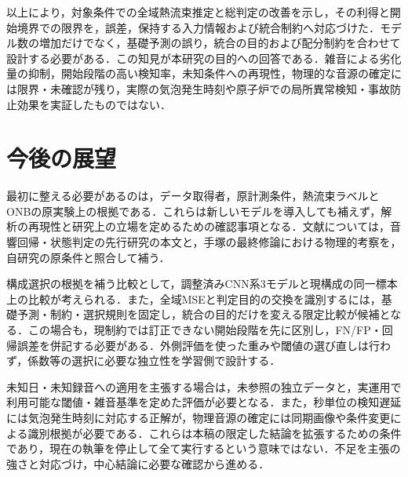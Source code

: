 以上により，対象条件での全域熱流束推定と総判定の改善を示し，その利得と開始境界での限界を，誤差，保持する入力情報および統合制約へ対応づけた．モデル数の増加だけでなく，基礎予測の誤り，統合の目的および配分制約を合わせて設計する必要がある．この知見が本研究の目的への回答である．雑音による劣化量の抑制，開始段階の高い検知率，未知条件への再現性，物理的な音源の確定には限界・未確認が残り，実際の気泡発生時刻や原子炉での局所異常検知・事故防止効果を実証したものではない．

\section{今後の展望}
最初に整える必要があるのは，データ取得者，原計測条件，熱流束ラベルとONBの原実験上の根拠である．これらは新しいモデルを導入しても補えず，解析の再現性と研究上の立場を定めるための確認事項となる．文献については，音響回帰・状態判定の先行研究の本文と，手塚の最終修論における物理的考察を，自研究の原条件と照合して補う．

構成選択の根拠を補う比較として，調整済みCNN系3モデルと現構成の同一標本上の比較が考えられる．また，全域MSEと判定目的の交換を識別するには，基礎予測・制約・選択規則を固定し，統合の目的だけを変える限定比較が候補となる．この場合も，現制約では訂正できない開始段階を先に区別し，FN/FP・回帰誤差を併記する必要がある．外側評価を使った重みや閾値の選び直しは行わず，係数等の選択に必要な独立性を学習側で設計する．

未知日・未知録音への適用を主張する場合は，未参照の独立データと，実運用で利用可能な閾値・雑音基準を定めた評価が必要となる．また，秒単位の検知遅延には気泡発生時刻に対応する正解が，物理音源の確定には同期画像や条件変更による識別根拠が必要である．これらは本稿の限定した結論を拡張するための条件であり，現在の執筆を停止して全て実行するという意味ではない．不足を主張の強さと対応づけ，中心結論に必要な確認から進める．
